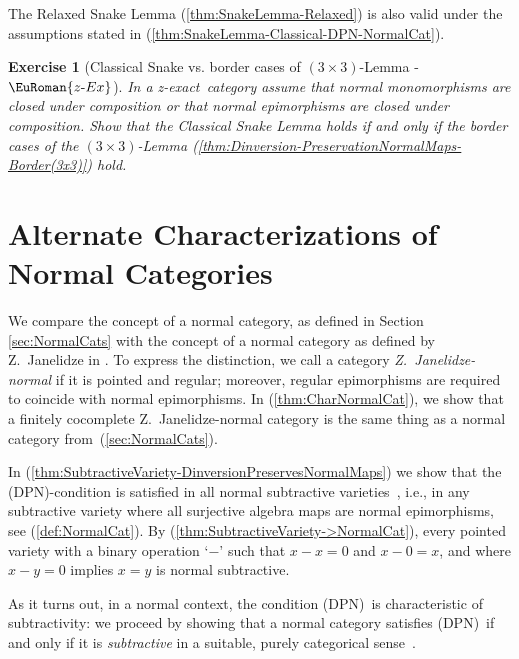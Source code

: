 \documentclass [12pt,oneside]{book}%
\theoremstyle{captionstyle}  %
\newtheorem{exercise}[theorem]{Exercise}
\newenvironment{exercises}{%
	\def\FrameCommand{{\color{Maroon}\vrule width 0pt}\hspace{0pt}\fboxsep=\FrameSep}%
	\MakeFramed{\hsize=0.95\linewidth\advance\hsize-\width\FrameRestore%
		\bigskip
		\textbf{Exercises}\vspace{-2ex}\footnotesize{
		}}
}
{\endMakeFramed}
\newcommand{\hy}{\text{-}}													%
\newcommand{\ZExact}{z-exact}									%
\newcommand{\Prdct}[2]{#1 \times #2}	 	%
\newcommand{\ZExactTag}{ - {\color{Cerulean} $\EuRoman{z\hy Ex}$}}
\newcommand{\DPNInline}{(DPN)}																%
\begin{document}
The Relaxed Snake Lemma  (\ref{thm:SnakeLemma-Relaxed}) is also valid under the assumptions stated in (\ref{thm:SnakeLemma-Classical-DPN-NormalCat}).



\begin{exercises}

\begin{exercise}[Classical Snake vs. border cases of $(\Prdct{3}{3})$-Lemma\ZExactTag]
    \label{exe:SnakeVs(3,3)-Lemma}%
    In a \ZExact\ category assume that normal monomorphisms are closed under composition or that normal epimorphisms are closed under composition. Show that the Classical Snake Lemma holds if and only if the border cases of the $(\Prdct{3}{3})$-Lemma (\ref{thm:Dinversion-PreservationNormalMaps-Border(3x3)}) hold.
\end{exercise}
\end{exercises}

\bigskip\bigskip\bigskip

\section[Alternate Characterizations of Normal Categories]{Alternate Characterizations of Normal Categories}
\label{sec:AlternateNormal}

We compare the concept of a normal category, as defined in Section \ref{sec:NormalCats} with the concept of a normal category as defined by Z.~Janelidze in \cite[Sec.~1]{ZJanelidze-Snake}. To express the distinction, we call a category \emph{Z.~Janelidze-normal} if it is pointed and regular; moreover, regular epimorphisms are required to coincide with normal epimorphisms. In (\ref{thm:CharNormalCat}), we show that a finitely cocomplete Z.~Janelidze-normal category is the same thing as a normal category from~(\ref{sec:NormalCats}).

In (\ref{thm:SubtractiveVariety-DinversionPreservesNormalMaps}) we show that the \DPNInline-condition is satisfied in all normal subtractive varieties~\cite{ZJanelidze-Snake}, i.e., in any subtractive variety where all surjective algebra maps are normal epimorphisms, see (\ref{def:NormalCat}). By (\ref{thm:SubtractiveVariety->NormalCat}), every pointed variety with a binary operation `$-$' such that $x-x=0$ and $x-0=x$, and where $x-y=0$ implies $x=y$ is normal subtractive.

As it turns out, in a normal context, the condition \DPNInline\ is characteristic of subtractivity: we proceed by showing that a normal category satisfies \DPNInline\ if and only if it is \emph{subtractive} in a suitable, purely categorical sense~\cite{ZJanelidze-Snake}.
\end{document}

